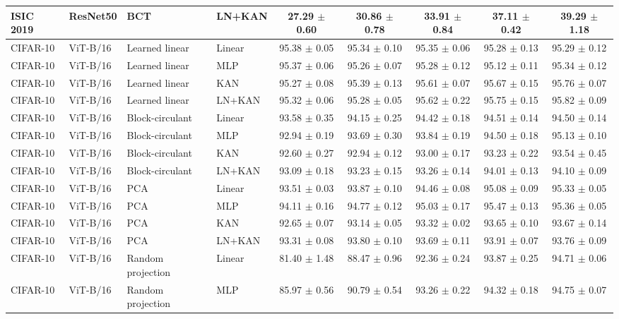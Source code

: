 \documentclass[10pt]{article}
\begin{document}
\begin{longtable}{llllccccc}
ISIC 2019 & ResNet50 & BCT & LN+KAN & 27.29 $\pm$ 0.60 & 30.86 $\pm$ 0.78 & 33.91 $\pm$ 0.84 & 37.11 $\pm$ 0.42 & 39.29 $\pm$ 1.18 \\
\midrule
CIFAR-10 & ViT-B/16 & Learned linear & Linear & 95.38 $\pm$ 0.05 & 95.34 $\pm$ 0.10 & 95.35 $\pm$ 0.06 & 95.28 $\pm$ 0.13 & 95.29 $\pm$ 0.12 \\
CIFAR-10 & ViT-B/16 & Learned linear & MLP & 95.37 $\pm$ 0.06 & 95.26 $\pm$ 0.07 & 95.28 $\pm$ 0.12 & 95.12 $\pm$ 0.11 & 95.34 $\pm$ 0.12 \\
CIFAR-10 & ViT-B/16 & Learned linear & KAN & 95.27 $\pm$ 0.08 & 95.39 $\pm$ 0.13 & 95.61 $\pm$ 0.07 & 95.67 $\pm$ 0.15 & 95.76 $\pm$ 0.07 \\
CIFAR-10 & ViT-B/16 & Learned linear & LN+KAN & 95.32 $\pm$ 0.06 & 95.28 $\pm$ 0.05 & 95.62 $\pm$ 0.22 & 95.75 $\pm$ 0.15 & 95.82 $\pm$ 0.09 \\
CIFAR-10 & ViT-B/16 & Block-circulant & Linear & 93.58 $\pm$ 0.35 & 94.15 $\pm$ 0.25 & 94.42 $\pm$ 0.18 & 94.51 $\pm$ 0.14 & 94.50 $\pm$ 0.14 \\
CIFAR-10 & ViT-B/16 & Block-circulant & MLP & 92.94 $\pm$ 0.19 & 93.69 $\pm$ 0.30 & 93.84 $\pm$ 0.19 & 94.50 $\pm$ 0.18 & 95.13 $\pm$ 0.10 \\
CIFAR-10 & ViT-B/16 & Block-circulant & KAN & 92.60 $\pm$ 0.27 & 92.94 $\pm$ 0.12 & 93.00 $\pm$ 0.17 & 93.23 $\pm$ 0.22 & 93.54 $\pm$ 0.45 \\
CIFAR-10 & ViT-B/16 & Block-circulant & LN+KAN & 93.09 $\pm$ 0.18 & 93.23 $\pm$ 0.15 & 93.26 $\pm$ 0.14 & 94.01 $\pm$ 0.13 & 94.10 $\pm$ 0.09 \\
CIFAR-10 & ViT-B/16 & PCA & Linear & 93.51 $\pm$ 0.03 & 93.87 $\pm$ 0.10 & 94.46 $\pm$ 0.08 & 95.08 $\pm$ 0.09 & 95.33 $\pm$ 0.05 \\
CIFAR-10 & ViT-B/16 & PCA & MLP & 94.11 $\pm$ 0.16 & 94.77 $\pm$ 0.12 & 95.03 $\pm$ 0.17 & 95.47 $\pm$ 0.13 & 95.36 $\pm$ 0.05 \\
CIFAR-10 & ViT-B/16 & PCA & KAN & 92.65 $\pm$ 0.07 & 93.14 $\pm$ 0.05 & 93.32 $\pm$ 0.02 & 93.65 $\pm$ 0.10 & 93.67 $\pm$ 0.14 \\
CIFAR-10 & ViT-B/16 & PCA & LN+KAN & 93.31 $\pm$ 0.08 & 93.80 $\pm$ 0.10 & 93.69 $\pm$ 0.11 & 93.91 $\pm$ 0.07 & 93.76 $\pm$ 0.09 \\
CIFAR-10 & ViT-B/16 & Random projection & Linear & 81.40 $\pm$ 1.48 & 88.47 $\pm$ 0.96 & 92.36 $\pm$ 0.24 & 93.87 $\pm$ 0.25 & 94.71 $\pm$ 0.06 \\
CIFAR-10 & ViT-B/16 & Random projection & MLP & 85.97 $\pm$ 0.56 & 90.79 $\pm$ 0.54 & 93.26 $\pm$ 0.22 & 94.32 $\pm$ 0.18 & 94.75 $\pm$ 0.07 \\

\end{longtable}
\end{document}
